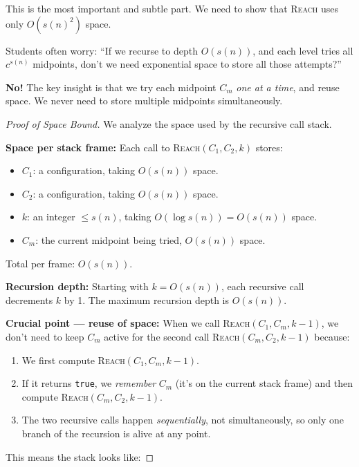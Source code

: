 \documentclass[12pt,a4paper]{article}
\theoremstyle{plain}
\theoremstyle{definition}
\theoremstyle{remark}
\begin{document}
This is the most important and subtle part. We need to show that \textsc{Reach} uses only $O(s(n)^2)$ space.

\begin{warningbox}
Students often worry: ``If we recurse to depth $O(s(n))$, and each level tries all $c^{s(n)}$ midpoints, don't we need exponential space to store all those attempts?''

\textbf{No!} The key insight is that we try each midpoint $C_m$ \emph{one at a time}, and reuse space. We never need to store multiple midpoints simultaneously.
\end{warningbox}

\begin{proof}[Proof of Space Bound]
We analyze the space used by the recursive call stack.

\textbf{Space per stack frame:} Each call to \textsc{Reach}$(C_1, C_2, k)$ stores:
\begin{itemize}
  \item $C_1$: a configuration, taking $O(s(n))$ space.
  \item $C_2$: a configuration, taking $O(s(n))$ space.
  \item $k$: an integer $\leq s(n)$, taking $O(\log s(n)) = O(s(n))$ space.
  \item $C_m$: the current midpoint being tried, $O(s(n))$ space.
\end{itemize}
Total per frame: $O(s(n))$.

\textbf{Recursion depth:} Starting with $k = O(s(n))$, each recursive call decrements $k$ by 1. The maximum recursion depth is $O(s(n))$.

\textbf{Crucial point — reuse of space:} When we call \textsc{Reach}$(C_1, C_m, k-1)$, we don't need to keep $C_m$ active for the second call \textsc{Reach}$(C_m, C_2, k-1)$ because:
\begin{enumerate}
  \item We first compute \textsc{Reach}$(C_1, C_m, k-1)$.
  \item If it returns \texttt{true}, we \emph{remember} $C_m$ (it's on the current stack frame) and then compute \textsc{Reach}$(C_m, C_2, k-1)$.
  \item The two recursive calls happen \emph{sequentially}, not simultaneously, so only one branch of the recursion is alive at any point.
\end{enumerate}
This means the stack looks like:


\end{proof}
\end{document}
